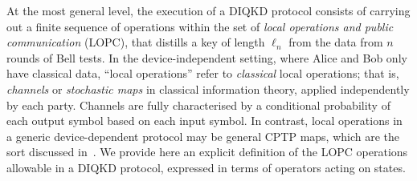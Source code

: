 \documentclass[10pt, a4paper]{article}
\numberwithin{equation}{section} %
\theoremstyle{definition}
\theoremstyle{plain}
\newcommand{\?}{\mathrel{?}} %
\begin{document}
    At the most general level, the execution of a DIQKD protocol consists of carrying out a finite sequence of operations within the set of \emph{local operations and public communication} (LOPC), that distills a key of length \(\ell_n\) from the data from \(n\) rounds of Bell tests. In the device-independent setting, where Alice and Bob only have classical data, ``local operations'' refer to \emph{classical} local operations; that is, \emph{channels} or \emph{stochastic maps} in classical information theory, applied independently by each party. Channels are fully characterised by a conditional probability of each output symbol based on each input symbol. In contrast, local operations in a generic device-dependent protocol may be general CPTP maps, which are the sort discussed in~\cite{CQKeyDistill}. We provide here an explicit definition of the LOPC operations allowable in a DIQKD protocol, expressed in terms of operators acting on states.
\end{document}
